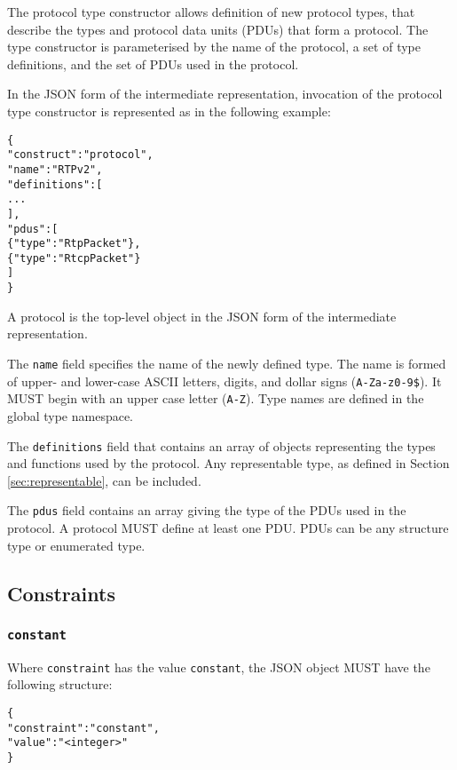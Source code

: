 \documentclass[10pt,twocolumn,a4paper]{article}
\newcommand{\code}[1]{\texttt{#1}}
\begin{document}
The protocol type constructor allows definition of new protocol types, that
describe the types and protocol data units (PDUs) that form a protocol. The
type constructor is parameterised by the name of the protocol, a set of
type definitions, and the set of PDUs used in the protocol.

In the JSON form of the intermediate representation, invocation of the
protocol type constructor is represented as in the following example:
\footnotesize
\begin{alltt}
  \{
    "construct"   : "protocol",
    "name"        : "RTPv2",
    "definitions" : [
                      ...
                    ],
    "pdus"        : [
       \{"type" : "RtpPacket"\},
       \{"type" : "RtcpPacket"\}
    ]
  \}
\end{alltt}
\normalsize
A protocol is the top-level object in the JSON form of the intermediate
representation.

The \code{name} field specifies the name of the newly defined type. The
name is formed of upper- and lower-case ASCII letters, digits, and dollar
signs (\code{A-Za-z0-9\$}).  It MUST begin with an upper case letter
(\code{A-Z}). Type names are defined in the global type namespace.

The \code{definitions} field that contains an array of objects representing
the types and functions used by the protocol. Any representable type, as
defined in Section \ref{sec:representable}, can be included.

The \code{pdus} field contains an array giving the type of the PDUs used
in the protocol. A protocol MUST define at least one PDU. PDUs can be any
structure type or enumerated type. 

\subsection{Constraints}
\label{sec:constraints}

\subsubsection{\texttt{constant}}

Where \texttt{constraint} has the value \texttt{constant}, the JSON object MUST have the
following structure:

\footnotesize
\begin{alltt}
  \{
    "constraint"    : "constant",
    "value"         : "<integer>"
  \}
\end{alltt}
\normalsize
\end{document}
